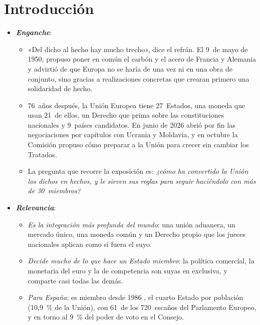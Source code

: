 \documentclass[11pt]{article}
\begin{document}
\tceetitulo

\section*{Introducción}

\begin{itemize}
\item \textbf{\emph{Enganche}}:
  \begin{itemize}
  \item «Del dicho al hecho hay mucho trecho», dice el refrán. El 9~de mayo de 1950,  propuso poner en común el carbón y el acero de Francia y Alemania y advirtió de que Europa no se haría de una vez ni en una obra de conjunto, sino gracias a realizaciones concretas que crearan primero una solidaridad de hecho.
  \item 76~años después, la Unión Europea tiene 27~Estados, una moneda que usan 21~de ellos, un Derecho que prima sobre las constituciones nacionales y 9~países candidatos. En junio de 2026 abrió por fin las negociaciones por capítulos con Ucrania y Moldavia\nocite{Consejo2026UcraniaMoldavia}, y en octubre la Comisión propuso cómo preparar a la Unión para crecer sin cambiar los Tratados\nocite{CE2026Ampliada}.
  \item La pregunta que recorre la exposición es: \emph{¿cómo ha convertido la Unión los dichos en hechos, y le sirven sus reglas para seguir haciéndolo con más de 30~miembros?}
  \end{itemize}

\item \textbf{\emph{Relevancia}}:
  \begin{itemize}
  \item \emph{Es la integración más profunda del mundo}: una unión aduanera, un mercado único, una moneda común y un Derecho propio que los jueces nacionales aplican como si fuera el suyo.
  \item \emph{Decide mucho de lo que hace un Estado miembro}: la política comercial, la monetaria del euro y la de competencia son suyas en exclusiva, y comparte casi todas las demás.
  \item \emph{Para España}: es miembro desde 1986 , el cuarto Estado por población (10,9~\% de la Unión), con 61~de los 720~escaños del Parlamento Europeo, y en torno al 9~\% del poder de voto en el Consejo.
  \end{itemize}


\end{itemize}
\end{document}
